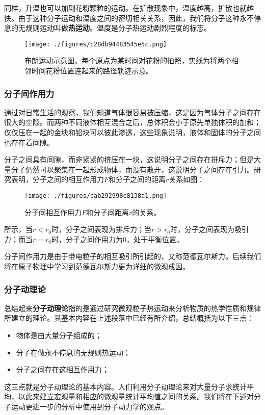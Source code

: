 同样，升温也可以加剧花粉颗粒的运动。在扩散现象中，温度越高，扩散也就越快。由于这种分子运动和温度之间的密切相关关系，因此，我们将分子这种永不停息的无规则运动叫做\textbf{热运动}。温度是分子热运动剧烈程度的标志。
\begin{figure}[ht]
\centering
\texttt{[image: ./figures/c28db94483545e5c.png]}
\caption{布朗运动示意图。每个原点为某时间对花粉的拍照，实线为将两个相邻时间花粉位置连起来的路径轨迹示意。} \label{fig_thermo}
\end{figure}

\subsubsection{分子间作用力}
通过对日常生活的观察，我们知道气体很容易被压缩，这是因为气体分子之间存在很大的空隙。而两种不同液体相互混合之后，总体积会小于原先单独体积的加和；仅仅压在一起的金块和铅块可以彼此渗透，这些现象说明，液体和固体的分子之间也存在着间隙。

分子之间具有间隙，而非紧紧的挤压在一块，这说明分子之间存在排斥力；但是大量分子仍然可以聚集在一起形成物体，而没有散开，这说明分子之间存在引力。研究表明，分子之间的相互作用力$F$和分子之间的距离$r$关系如图：
\begin{figure}[ht]
\centering
\texttt{[image: ./figures/cab292998c8138a1.png]}
\caption{分子间相互作用力$F$和分子间距离$r$的关系。} \label{fig_thermo_fig2}
\end{figure}
所示，当$r<r_0$时，分子之间表现为排斥力；当$r>r_0$时，分子之间表现为吸引力；而当$r=r_0$时，分子之间作用力为$0$，处于平衡位置。

分子间作用力是由于带电粒子的相互吸引所引起的，又称范德瓦尔斯力。后续我们将在原子物理中学习到范德瓦尔斯力更为详细的微观成因。
\subsubsection{分子动理论}
总结起来\textbf{分子动理论}指的是通过研究微观粒子热运动来分析物质的热学性质和规律所建立的理论。其基本内容在上述段落中已经有所介绍，总结概括为以下三点：
\begin{itemize}
\item 物体是由大量分子组成的；
\item  分子在做永不停息的无规则热运动；
\item 分子之间存在这相互作用力；
\end{itemize}这三点就是分子动理论的基本内容。人们利用分子动理论来对大量分子求统计平均，以此来建立宏观量和相应的微观量统计平均值之间的关系。我们将在下述对分子运动更进一步的分析中使用到分子动力学的观点。

